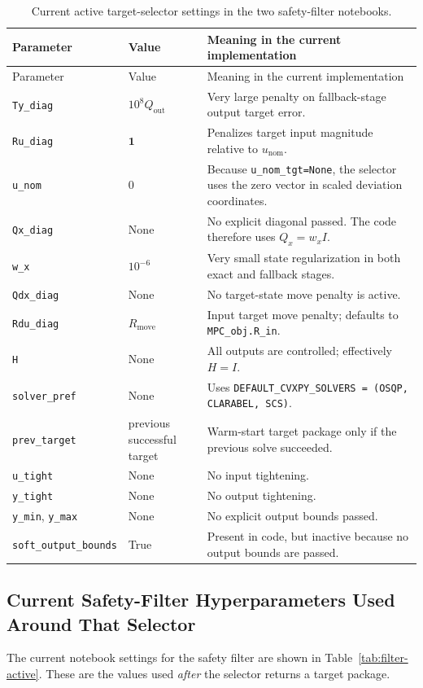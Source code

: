 \documentclass[11pt]{article}
\begin{document}
\begin{longtable}{>{\raggedright\arraybackslash}p{} >{\raggedright\arraybackslash}p{} >{\raggedright\arraybackslash}p{}}
\caption{Current active target-selector settings in the two safety-filter notebooks.}
\label{tab:selector-active}\\
\toprule
Parameter & Value & Meaning in the current implementation \\
\midrule
\endfirsthead
\toprule
Parameter & Value & Meaning in the current implementation \\
\midrule
\endhead
\texttt{Ty\_diag} & $10^8 Q_{\mathrm{out}}$ & Very large penalty on fallback-stage output target error. \\
\texttt{Ru\_diag} & $\mathbf{1}$ & Penalizes target input magnitude relative to $u_{\mathrm{nom}}$. \\
\texttt{u\_nom} & $0$ & Because \texttt{u\_nom\_tgt=None}, the selector uses the zero vector in scaled deviation coordinates. \\
\texttt{Qx\_diag} & None & No explicit diagonal passed. The code therefore uses $Q_x = w_x I$. \\
\texttt{w\_x} & $10^{-6}$ & Very small state regularization in both exact and fallback stages. \\
\texttt{Qdx\_diag} & None & No target-state move penalty is active. \\
\texttt{Rdu\_diag} & $R_{\mathrm{move}}$ & Input target move penalty; defaults to \texttt{MPC\_obj.R\_in}. \\
\texttt{H} & None & All outputs are controlled; effectively $H=I$. \\
\texttt{solver\_pref} & None & Uses \texttt{DEFAULT\_CVXPY\_SOLVERS = (OSQP, CLARABEL, SCS)}. \\
\texttt{prev\_target} & previous successful target & Warm-start target package only if the previous solve succeeded. \\
\texttt{u\_tight} & None & No input tightening. \\
\texttt{y\_tight} & None & No output tightening. \\
\texttt{y\_min}, \texttt{y\_max} & None & No explicit output bounds passed. \\
\texttt{soft\_output\_bounds} & True & Present in code, but inactive because no output bounds are passed. \\
\bottomrule
\end{longtable}

\subsection{Current Safety-Filter Hyperparameters Used Around That Selector}
The current notebook settings for the safety filter are shown in Table~\ref{tab:filter-active}. These are the values used \emph{after} the selector returns a target package.
\end{document}

